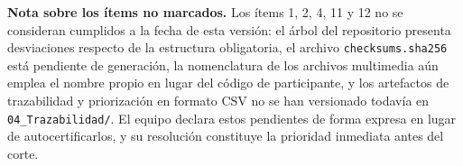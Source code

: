 \documentclass[journal,onecolumn]{IEEEtran}
\begin{document}
	\textbf{Nota sobre los ítems no marcados.} Los ítems 1, 2, 4, 11 y 12 no se
	consideran cumplidos a la fecha de esta versión: el árbol del repositorio
	presenta desviaciones respecto de la estructura obligatoria, el archivo
	\texttt{checksums.sha256} está pendiente de generación, la nomenclatura de
	los archivos multimedia aún emplea el nombre propio en lugar del código de
	participante, y los artefactos de trazabilidad y priorización en formato CSV
	no se han versionado todavía en \texttt{04\_Trazabilidad/}. El equipo
	declara estos pendientes de forma expresa en lugar de autocertificarlos, y
	su resolución constituye la prioridad inmediata antes del corte.
	
\end{document}
